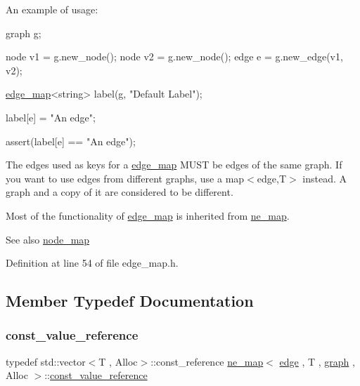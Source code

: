 An example of usage\+: 
\begin{DoxyPre}
  graph g;\end{DoxyPre}



\begin{DoxyPre}  node v1 = g.new\_node();
  node v2 = g.new\_node();
  edge e = g.new\_edge(v1, v2);\end{DoxyPre}



\begin{DoxyPre}  \mbox{\hyperlink{classedge__map}{edge\_map}}<string> label(g, "Default Label");\end{DoxyPre}



\begin{DoxyPre}  label[e] = "An edge";\end{DoxyPre}



\begin{DoxyPre}  assert(label[e] == "An edge");
\end{DoxyPre}


The edges used as keys for a {\ttfamily \mbox{\hyperlink{classedge__map}{edge\+\_\+map}}} M\+U\+ST be edges of the same graph. If you want to use edges from different graphs, use a {\ttfamily map$<$edge,T$>$} instead. A graph and a copy of it are considered to be different.

Most of the functionality of {\ttfamily \mbox{\hyperlink{classedge__map}{edge\+\_\+map}}} is inherited from \mbox{\hyperlink{classne__map}{ne\+\_\+map}}.

\begin{DoxySeeAlso}{See also}
\mbox{\hyperlink{classnode__map}{node\+\_\+map}} 
\end{DoxySeeAlso}


Definition at line 54 of file edge\+\_\+map.\+h.



\subsection{Member Typedef Documentation}
\mbox{\label{classne__map_ad2be1a01de53940aee1282ec0e34f0f7}} 
\subsubsection{\texorpdfstring{const\+\_\+value\+\_\+reference}{const\_value\_reference}}
{\footnotesize\ttfamily typedef std\+::vector$<$T , Alloc$>$\+::const\+\_\+reference \mbox{\hyperlink{classne__map}{ne\+\_\+map}}$<$ \mbox{\hyperlink{classedge}{edge}} , T , \mbox{\hyperlink{classgraph}{graph}} , Alloc $>$\+::\mbox{\hyperlink{classne__map_ad2be1a01de53940aee1282ec0e34f0f7}{const\+\_\+value\+\_\+reference}}\hspace{0.3cm}{\ttfamily [inherited]}}



